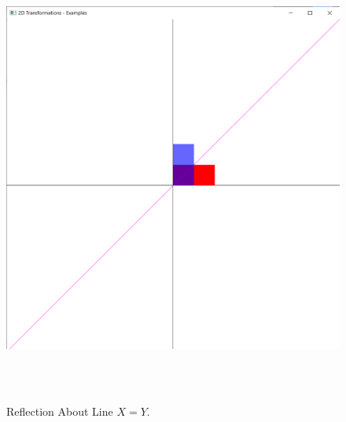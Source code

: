 \documentclass[12pt, a4]{article}
\begin{document}
\subsection*{}
\begin{figure}[h]
\centering
\caption{Reflection About Line $X = Y$.}
\includegraphics[height=15cm, width=15cm]{Outputs/Output-8.png}
\end{figure}

\newpage
\end{document}

